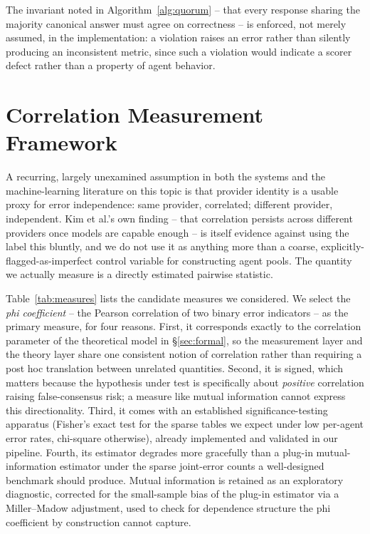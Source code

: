 \documentclass[journal]{IEEEtran}
\begin{document}
The invariant noted in Algorithm~\ref{alg:quorum} -- that every response sharing the majority canonical answer must agree on correctness -- is enforced, not merely assumed, in the implementation: a violation raises an error rather than silently producing an inconsistent metric, since such a violation would indicate a scorer defect rather than a property of agent behavior.

\section{Correlation Measurement Framework}
\label{sec:correlation}

A recurring, largely unexamined assumption in both the systems and the machine-learning literature on this topic is that provider identity is a usable proxy for error independence: same provider, correlated; different provider, independent. Kim et al.'s own finding -- that correlation persists across different providers once models are capable enough -- is itself evidence against using the label this bluntly, and we do not use it as anything more than a coarse, explicitly-flagged-as-imperfect control variable for constructing agent pools. The quantity we actually measure is a directly estimated pairwise statistic.

Table~\ref{tab:measures} lists the candidate measures we considered. We select the \emph{phi coefficient} -- the Pearson correlation of two binary error indicators -- as the primary measure, for four reasons. First, it corresponds exactly to the correlation parameter of the theoretical model in \S\ref{sec:formal}, so the measurement layer and the theory layer share one consistent notion of correlation rather than requiring a post hoc translation between unrelated quantities. Second, it is signed, which matters because the hypothesis under test is specifically about \emph{positive} correlation raising false-consensus risk; a measure like mutual information cannot express this directionality. Third, it comes with an established significance-testing apparatus (Fisher's exact test for the sparse tables we expect under low per-agent error rates, chi-square otherwise), already implemented and validated in our pipeline. Fourth, its estimator degrades more gracefully than a plug-in mutual-information estimator under the sparse joint-error counts a well-designed benchmark should produce. Mutual information is retained as an exploratory diagnostic, corrected for the small-sample bias of the plug-in estimator via a Miller--Madow adjustment, used to check for dependence structure the phi coefficient by construction cannot capture.
\end{document}
